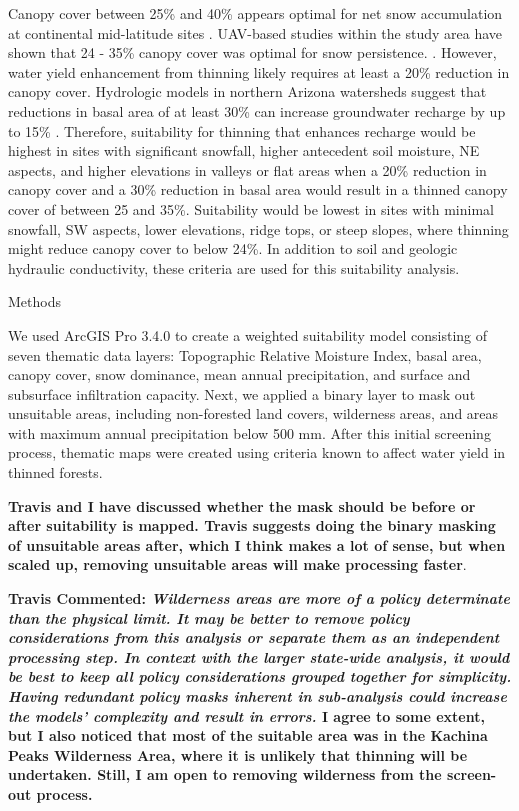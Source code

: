 \documentclass[
  number,
  preprint,
  3p,
  onecolumn]{elsarticle}
\begin{document}
Canopy cover between 25\% and 40\% appears optimal for net snow
accumulation at continental mid-latitude sites \citep{veatch2009}.
UAV-based studies within the study area have shown that 24 - 35\% canopy
cover was optimal for snow persistence.
\citep{donager2021, sankey_multi-scale_2015, belmonte_uav-based_2021}.
However, water yield enhancement from thinning likely requires at least
a 20\% reduction in canopy cover\citep{adams_ecohydrological_2012}.
Hydrologic models in northern Arizona watersheds suggest that reductions
in basal area of at least 30\% can increase groundwater recharge by up
to 15\% \citep{wyatt2015}. Therefore, suitability for thinning that
enhances recharge would be highest in sites with significant snowfall,
higher antecedent soil moisture, NE aspects, and higher elevations in
valleys or flat areas when a 20\% reduction in canopy cover and a 30\%
reduction in basal area would result in a thinned canopy cover of
between 25 and 35\%. Suitability would be lowest in sites with minimal
snowfall, SW aspects, lower elevations, ridge tops, or steep slopes,
where thinning might reduce canopy cover to below 24\%. In addition to
soil and geologic hydraulic conductivity, these criteria are used for
this suitability analysis.

Methods

We used ArcGIS Pro 3.4.0 to create a weighted suitability model
consisting of seven thematic data layers: Topographic Relative Moisture
Index, basal area, canopy cover, snow dominance, mean annual
precipitation, and surface and subsurface infiltration capacity. Next,
we applied a binary layer to mask out unsuitable areas, including
non-forested land covers, wilderness areas, and areas with maximum
annual precipitation below 500 mm. After this initial screening process,
thematic maps were created using criteria known to affect water yield in
thinned forests.

\textbf{Travis and I have discussed whether the mask should be before or
after suitability is mapped. Travis suggests doing the binary masking of
unsuitable areas after, which I think makes a lot of sense, but when
scaled up, removing unsuitable areas will make processing faster}.

\textbf{Travis Commented: \emph{Wilderness areas are more of a policy
determinate than the physical limit. It may be better to remove policy
considerations from this analysis or separate them as an independent
processing step. In context with the larger state-wide analysis, it
would be best to keep all policy considerations grouped together for
simplicity. Having redundant policy masks inherent in sub-analysis could
increase the models' complexity and result in errors.} I agree to some
extent, but I also noticed that most of the suitable area was in the
Kachina Peaks Wilderness Area, where it is unlikely that thinning will
be undertaken. Still, I am open to removing wilderness from the
screen-out process.}
\end{document}
